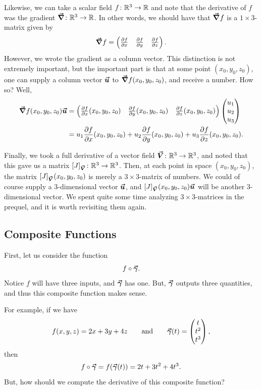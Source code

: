      	Likewise, we can take a scalar field $f\colon \mathbb{R}^3 \to \mathbb{R}$ and note that the derivative of $f$ was the gradient $\boldsymbol{\vec{\nabla}} \colon \mathbb{R}^3 \to \mathbb{R}$.  In other words, we should have that $\boldsymbol{\vec{\nabla}} f$ is a $1\times 3$-matrix given by
     	\[
     	\boldsymbol{\vec{\nabla}} f = \begin{pmatrix} \frac{\partial f}{\partial x} & \frac{\partial f}{\partial y} & \frac{\partial f}{\partial z} \end{pmatrix}.
     	\] 
     	However, we wrote the gradient as a column vector.  This distinction is not extremely important, but the important part is that at some point $(x_0,y_0,z_0)$, one can supply a column vector $\boldsymbol{\boldsymbol{\vec{u}}}$ to $\boldsymbol{\vec{\nabla}} f(x_0,y_0,z_0)$, and receive a number. How so? Well,
     	\begin{align*}
     	\boldsymbol{\vec{\nabla}} f(x_0,y_0,z_0) \boldsymbol{\boldsymbol{\vec{u}}} &= \begin{pmatrix} \frac{\partial f}{\partial x}(x_0,y_0,z_0) & \frac{\partial f}{\partial y} (x_0,y_0,z_0) & \frac{\partial f}{\partial z}(x_0,y_0,z_0) \end{pmatrix} \begin{pmatrix} u_1 \\ u_2 \\ u_3 \end{pmatrix}\\
     	&= u_1 \frac{\partial f}{\partial x}(x_0,y_0,z_0)+ u_2 \frac{\partial f}{\partial y}(x_0,y_0,z_0)+ u_3 \frac{\partial f}{\partial z}(x_0,y_0,z_0).
     	\end{align*}
     	
     	Finally, we took a full derivative of a vector field $\boldsymbol{\vec{V}} \colon \mathbb{R}^3 \to \mathbb{R}^3$, and noted that this gave us a matrix $[J]_{\boldsymbol{\vec{V}}} \colon \mathbb{R}^3 \to \mathbb{R}^3$. Then, at each point in space $(x_0,y_0,z_0)$, the matrix $[J]_{\boldsymbol{\vec{V}}}(x_0,y_0,z_0)$ is merely a $3\times 3$-matrix of numbers. We could of course supply a 3-dimensional vector $\boldsymbol{\boldsymbol{\vec{u}}}$, and $[J]_{\boldsymbol{\vec{V}}}(x_0,y_0,z_0)\boldsymbol{\boldsymbol{\vec{u}}}$ will be another 3-dimensional vector.  We spent quite some time analyzing $3\times 3$-matrices in the prequel, and it is worth revisiting them again.
     	
     	\subsection{Composite Functions}
     	
     	First, let us consider the function 
     	\[
     	f\circ \boldsymbol{\vec{\gamma}}.
     	\]
     	Notice $f$ will have three inputs, and $\boldsymbol{\vec{\gamma}}$ has one. But, $\boldsymbol{\vec{\gamma}}$ outputs three quantities, and thus this composite function makes sense.
     	
     	For example, if we have 
     	\[
     	f(x,y,z) = 2x + 3y + 4z \qquad \textrm{and} \qquad \boldsymbol{\vec{\gamma}}(t) = \begin{pmatrix} t \\ t^2 \\ t^3 \end{pmatrix},
     	\]
     	then
     	\[
     	f\circ \boldsymbol{\vec{\gamma}} = f(\boldsymbol{\vec{\gamma}}(t)) = 2t+3t^2+4t^3.
     	\]
     	But, how should we compute the derivative of this composite function?
     	
